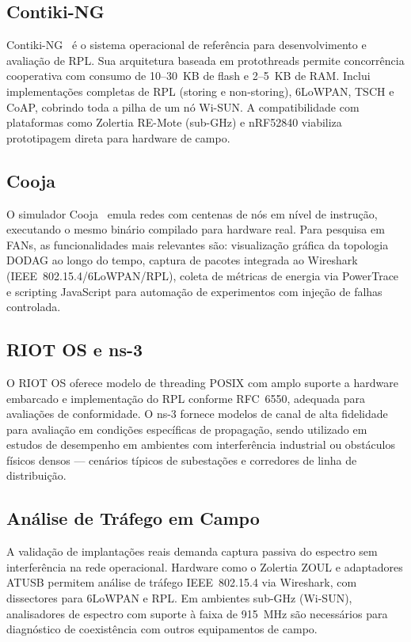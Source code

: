 \documentclass[conference]{IEEEtran}
\begin{document}
\subsection{Contiki-NG}

Contiki-NG~\cite{dunkels2004contiki} é o sistema operacional de referência para
desenvolvimento e avaliação de RPL. Sua arquitetura baseada em protothreads
permite concorrência cooperativa com consumo de 10--30~KB de flash e 2--5~KB de
RAM. Inclui implementações completas de RPL (storing e non-storing), 6LoWPAN,
TSCH e CoAP, cobrindo toda a pilha de um nó Wi-SUN. A compatibilidade com
plataformas como Zolertia RE-Mote (sub-GHz) e nRF52840 viabiliza prototipagem
direta para hardware de campo.

\subsection{Cooja}

O simulador Cooja~\cite{tsiftes2010cooja} emula redes com centenas de nós em
nível de instrução, executando o mesmo binário compilado para hardware real.
Para pesquisa em FANs, as funcionalidades mais relevantes são: visualização
gráfica da topologia DODAG ao longo do tempo, captura de pacotes integrada ao
Wireshark (IEEE~802.15.4/6LoWPAN/RPL), coleta de métricas de energia via
PowerTrace e scripting JavaScript para automação de experimentos com injeção
de falhas controlada.

\subsection{RIOT OS e ns-3}

O RIOT OS oferece modelo de threading POSIX com amplo suporte a hardware
embarcado e implementação do RPL conforme RFC~6550, adequada para avaliações de
conformidade. O ns-3 fornece modelos de canal de alta fidelidade para avaliação
em condições específicas de propagação, sendo utilizado em estudos de desempenho
em ambientes com interferência industrial ou obstáculos físicos densos --- cenários
típicos de subestações e corredores de linha de distribuição.

\subsection{Análise de Tráfego em Campo}

A validação de implantações reais demanda captura passiva do espectro sem
interferência na rede operacional. Hardware como o Zolertia ZOUL e adaptadores
ATUSB permitem análise de tráfego IEEE~802.15.4 via Wireshark, com dissectores
para 6LoWPAN e RPL. Em ambientes sub-GHz (Wi-SUN), analisadores de espectro com
suporte à faixa de 915~MHz são necessários para diagnóstico de coexistência com
outros equipamentos de campo.
\end{document}
